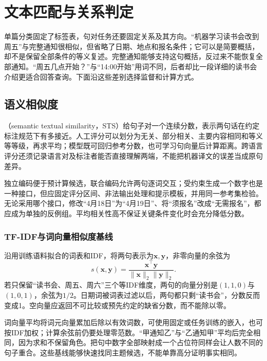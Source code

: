\section{文本匹配与关系判定}
\label{sec:nlp-classification-matching}

单篇分类固定了标签表，句对任务还要固定关系及其方向。“机器学习读书会改到周五”与完整通知很相似，但省略了日期、地点和报名条件；它可以是简要概括，却不是保留全部条件的等义复述。完整通知能够支持这句概括，反过来不能恢复全部通知。“周五几点开始？”与“14:00开始”用词不同，后者却比一段详细的读书会介绍更适合回答查询。下面沿这些差别选择监督和计算方式。

\subsection{语义相似度}
\label{sec:nlp-classification-similarity}

（semantic textual similarity，STS）给句子对一个连续分数，表示两句话在约定标注规范下有多接近。人工评分可以划分为无关、部分相关、主要内容相同和等义等等级，再求平均；模型既可回归参考分数，也可学习句向量后计算距离。跨语言评分还须记录语言对及标注者能否直接理解两端，不能把机器译文的误差当成原句差异。

独立编码便于预计算候选，联合编码允许两句逐词交互；受约束生成一个数字也是一种接口，但应固定评分区间、非法输出处理和提示模板，并用同一参考集检验。无论采用哪个接口，修改“4月18日”为“4月19日”、将“须报名”改成“无需报名”，都应成为单独的反例组。平均相关性高不保证关键条件变化时会充分降低分数。

\subsubsection{TF-IDF与词向量相似度基线}
\label{sec:nlp-classification-similarity-baseline}

沿用训练语料拟合的词表和IDF，将两句表示为$\bm x,\bm y$，非零向量的余弦为
\[
  s(\bm x,\bm y)=\frac{\bm x^\top\bm y}{\|\bm x\|_2\|\bm y\|_2}.
\]
若只保留“读书会、周五、周六”三个等IDF维度，两句的向量分别是$(1,1,0)$与$(1,0,1)$，余弦为$1/2$。日期词被词表过滤以后，两句都只剩“读书会”，分数反而变成1。空向量应返回不可比较或预先约定的缺省分数，而不能除以零。

词向量平均将词元向量累加后除以有效词数，可使用固定或任务训练的嵌入，也可按IDF加权；计算余弦前仍要处理零范数。“甲通知乙”与“乙通知甲”平均后完全相同，因为求和不保留角色。把句中数字全部映射成一个占位符同样会让人数不同的句子重合。这些基线能够快速找同主题候选，不能单靠高分证明事实相同。

